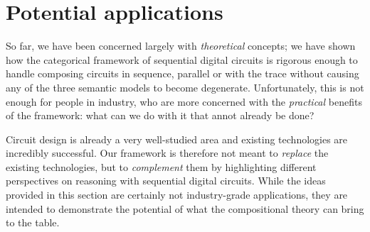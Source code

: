 \chapter{Potential applications}\label{chap:semantics-applications}

So far, we have been concerned largely with \emph{theoretical} concepts; we have
shown how the categorical framework of sequential digital circuits is rigorous
enough to handle composing circuits in sequence, parallel or with the trace
without causing any of the three semantic models to become degenerate.
Unfortunately, this is not enough for people in industry, who are more concerned
with the \emph{practical} benefits of the framework: what can we do with it that
annot already be done?

Circuit design is already a very well-studied area and existing technologies are
incredibly successful.
Our framework is therefore not meant to \emph{replace} the existing
technologies, but to \emph{complement} them by highlighting different
perspectives on reasoning with sequential digital circuits.
While the ideas provided in this section are certainly not industry-grade
applications, they are intended to demonstrate the potential of what
the compositional theory can bring to the table.








